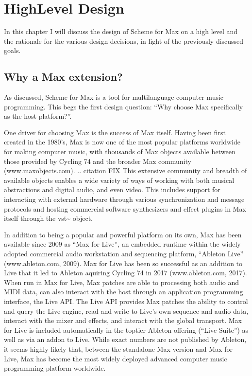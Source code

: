 \documentclass[letterpaper,10pt,english]{sphinxmanual}
\begin{document}
\sphinxstepscope


\chapter{High\sphinxhyphen{}Level Design}
\label{\detokenize{design:high-level-design}}\label{\detokenize{design::doc}}
\sphinxAtStartPar
In this chapter I will discuss the design of Scheme for Max on a high level
and the rationale for the various design decisions, in light of the previously discussed goals.


\section{Why a Max extension?}
\label{\detokenize{design:why-a-max-extension}}
\sphinxAtStartPar
As discussed, Scheme for Max is a tool for multi\sphinxhyphen{}language computer music programming. This begs
the first design question: “Why choose Max specifically as the host platform?”.

\sphinxAtStartPar
One driver for choosing Max is the success of Max itself.
Having been first created in the 1980’s, Max is now one of the most popular platforms world\sphinxhyphen{}wide
for making computer music, with thousands of Max objects available between those provided by Cycling 74 and
the broader Max community (www.maxobjects.com).
.. citation FIX
This extensive community and breadth of available objects enables a wide variety of ways of working
with both musical abstractions and digital audio, and even video.
This includes support for interacting with external hardware through various synchronization and
message protocols and hosting commercial software synthesizers and effect plugins in Max itself through
the vst\textasciitilde{} object.

\sphinxAtStartPar
In addition to being a popular and powerful platform on its own, Max has been available since 2009 as “Max for Live”,
an embedded runtime within the widely adopted commercial audio workstation and sequencing platform, “Ableton Live”
(www.ableton.com, 2009).
Max for Live has been so successful as an addition to Live that it led to Ableton aquiring Cycling 74 in 2017
(www.ableton.com, 2017).
When run in Max for Live, Max patches are able to processing both audio
and MIDI data, can also interact with the host through an application programming interface, the Live API.
The Live API provides Max patches the ability to control and query the Live engine, read and write to
Live’s own sequence and audio data, interact with the mixer and effects, and interact with the global transport.
Max for Live is included automatically in the top\sphinxhyphen{}tier Ableton offering (“Live Suite”) as well as via an add\sphinxhyphen{}on to Live.
While exact numbers are not published by Ableton, it seems highly likely that, between the standalone Max
version and Max for Live, Max has become the most widely deployed advanced computer music programming platform worldwide.
\end{document}
